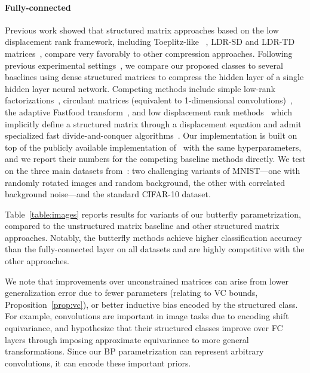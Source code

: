 \paragraph{Fully-connected}

Previous work showed that structured matrix approaches based on the low displacement rank framework, including Toeplitz-like ~\cite{sindhwani2015structured}, LDR-SD and LDR-TD matrices~\cite{thomas2018learning}, compare very favorably to other compression approaches. Following previous experimental settings~\cite{chen2015compressing,sindhwani2015structured,thomas2018learning}, we compare our proposed classes to several baselines using dense structured matrices to compress the hidden layer of a single hidden layer neural network. Competing methods include simple low-rank factorizations~\cite{denil2013predicting}, circulant matrices (equivalent to 1-dimensional convolutions)~\cite{cheng2015exploration}, the adaptive Fastfood transform~\cite{yang2015deep}, and low displacement rank methods~\cite{sindhwani2015structured,thomas2018learning} which implicitly define a structured matrix through a displacement equation and admit specialized fast divide-and-conquer algorithms~\cite{desa2018two}. Our implementation is built on top of the publicly available implementation of~\citet{thomas2018learning} with the same hyperparameters, and we report their numbers for the competing baseline methods directly. We test on the three main datasets from~\citet{thomas2018learning}: two challenging variants of MNIST---one with randomly rotated images and random background, the other with correlated background noise---and the standard CIFAR-10 dataset. 

Table~\ref{table:images} reports results for variants of our butterfly parametrization, compared to the unstructured matrix baseline and other structured matrix approaches. Notably, the butterfly methods achieve higher classification accuracy than the fully-connected layer on all datasets and are highly competitive with the other approaches.

We note that improvements over unconstrained matrices can arise from lower generalization error due to fewer parameters (relating to VC bounds, Proposition~\ref{prop:vc}), or better inductive bias encoded by the structured class. For example, convolutions are important in image tasks due to encoding shift equivariance, and \citet{thomas2018learning} hypothesize that their structured classes improve over FC layers through imposing approximate equivariance to more general transformations. Since our BP parametrization can represent arbitrary convolutions, it can encode these important priors.

